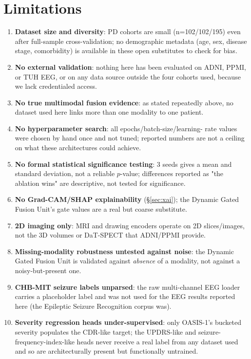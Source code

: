 \documentclass[conference]{IEEEtran}
\begin{document}
\section{Limitations}
\label{sec:limitations}
\begin{enumerate}
\item \textbf{Dataset size and diversity}: PD cohorts are small
(n=102/102/195) even after full-sample cross-validation; no demographic
metadata (age, sex, disease stage, comorbidity) is available in these
open substitutes to check for bias.
\item \textbf{No external validation}: nothing here has been evaluated
on ADNI, PPMI, or TUH EEG, or on any data source outside the four
cohorts used, because we lack credentialed access.
\item \textbf{No true multimodal fusion evidence}: as stated repeatedly
above, no dataset used here links more than one modality to one patient.
\item \textbf{No hyperparameter search}: all epochs/batch-size/learning-
rate values were chosen by hand once and not tuned; reported numbers are
not a ceiling on what these architectures could achieve.
\item \textbf{No formal statistical significance testing}: 3 seeds gives
a mean and standard deviation, not a reliable $p$-value; differences
reported as "the ablation wins" are descriptive, not tested for
significance.
\item \textbf{No Grad-CAM/SHAP explainability} (\S\ref{sec:xai}); the
Dynamic Gated Fusion Unit's gate values are a real but coarse substitute.
\item \textbf{2D imaging only}: MRI and drawing encoders operate on 2D
slices/images, not the 3D volumes or DaT-SPECT that ADNI/PPMI provide.
\item \textbf{Missing-modality robustness untested against noise}: the
Dynamic Gated Fusion Unit is validated against \emph{absence} of a
modality, not against a noisy-but-present one.
\item \textbf{CHB-MIT seizure labels unparsed}: the raw multi-channel
EEG loader carries a placeholder label and was not used for the EEG
results reported here (the Epileptic Seizure Recognition corpus was).
\item \textbf{Severity regression heads under-supervised}: only OASIS-1's
bucketed severity populates the CDR-like target; the UPDRS-like and
seizure-frequency-index-like heads never receive a real label from any
dataset used and so are architecturally present but functionally
untrained.
\end{enumerate}
\end{document}
